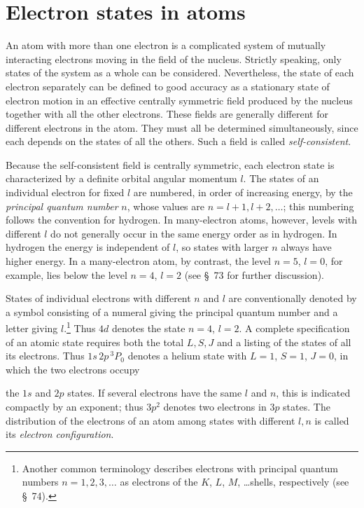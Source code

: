 \section{Electron states in atoms}

An atom with more than one electron is a complicated system of mutually interacting electrons moving in the field of the nucleus. Strictly speaking, only states of the system as a whole can be considered. Nevertheless, the state of each electron separately can be defined to good accuracy as a stationary state of electron motion in an effective centrally symmetric field produced by the nucleus together with all the other electrons. These fields are generally different for different electrons in the atom. They must all be determined simultaneously, since each depends on the states of all the others. Such a field is called \emph{self-consistent}.

Because the self-consistent field is centrally symmetric, each electron state is characterized by a definite orbital angular momentum $l$. The states of an individual electron for fixed $l$ are numbered, in order of increasing energy, by the \emph{principal quantum number} $n$, whose values are $n=l+1,l+2,\ldots$; this numbering follows the convention for hydrogen. In many-electron atoms, however, levels with different $l$ do not generally occur in the same energy order as in hydrogen. In hydrogen the energy is independent of $l$, so states with larger $n$ always have higher energy. In a many-electron atom, by contrast, the level $n=5$, $l=0$, for example, lies below the level $n=4$, $l=2$ (see \S~73 for further discussion).

States of individual electrons with different $n$ and $l$ are conventionally denoted by a symbol consisting of a numeral giving the principal quantum number and a letter giving $l$.\footnote{Another common terminology describes electrons with principal quantum numbers $n=1,2,3,\ldots$ as electrons of the $K$, $L$, $M$, \ldots shells, respectively (see \S~74).} Thus $4d$ denotes the state $n=4$, $l=2$. A complete specification of an atomic state requires both the total $L,S,J$ and a listing of the states of all its electrons. Thus $1s\,2p\,{}^3P_0$ denotes a helium state with $L=1$, $S=1$, $J=0$, in which the two electrons occupy

the $1s$ and $2p$ states. If several electrons have the same $l$ and $n$, this is indicated compactly by an exponent; thus $3p^2$ denotes two electrons in $3p$ states. The distribution of the electrons of an atom among states with different $l,n$ is called its \emph{electron configuration}.

